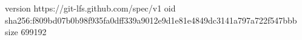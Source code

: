 version https://git-lfs.github.com/spec/v1
oid sha256:f809bd07b0b98f935fa0dff339a9012e9d1e81e4849dc3141a797a722f547bbb
size 699192
